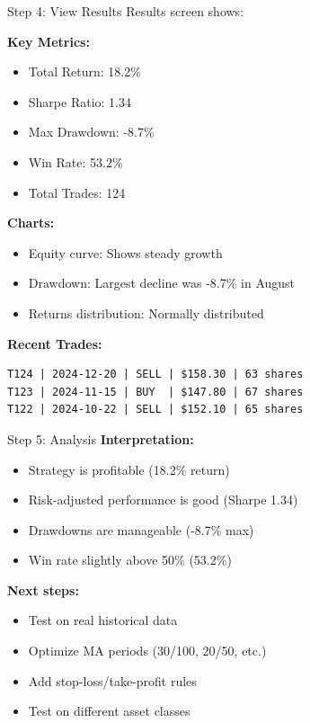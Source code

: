 \documentclass[11pt,a4paper]{article}
\begin{document}
\begin{example}{Step 4: View Results}
Results screen shows:

\textbf{Key Metrics:}
\begin{itemize}
  \item Total Return: 18.2\%
  \item Sharpe Ratio: 1.34
  \item Max Drawdown: -8.7\%
  \item Win Rate: 53.2\%
  \item Total Trades: 124
\end{itemize}

\textbf{Charts:}
\begin{itemize}
  \item Equity curve: Shows steady growth
  \item Drawdown: Largest decline was -8.7\% in August
  \item Returns distribution: Normally distributed
\end{itemize}

\textbf{Recent Trades:}
\begin{verbatim}
T124 | 2024-12-20 | SELL | $158.30 | 63 shares
T123 | 2024-11-15 | BUY  | $147.80 | 67 shares
T122 | 2024-10-22 | SELL | $152.10 | 65 shares
\end{verbatim}
\end{example}

\begin{example}{Step 5: Analysis}
\textbf{Interpretation:}
\begin{itemize}
  \item Strategy is profitable (18.2\% return)
  \item Risk-adjusted performance is good (Sharpe 1.34)
  \item Drawdowns are manageable (-8.7\% max)
  \item Win rate slightly above 50\% (53.2\%)
\end{itemize}

\textbf{Next steps:}
\begin{itemize}
  \item Test on real historical data
  \item Optimize MA periods (30/100, 20/50, etc.)
  \item Add stop-loss/take-profit rules
  \item Test on different asset classes
\end{itemize}
\end{example}
\end{document}
